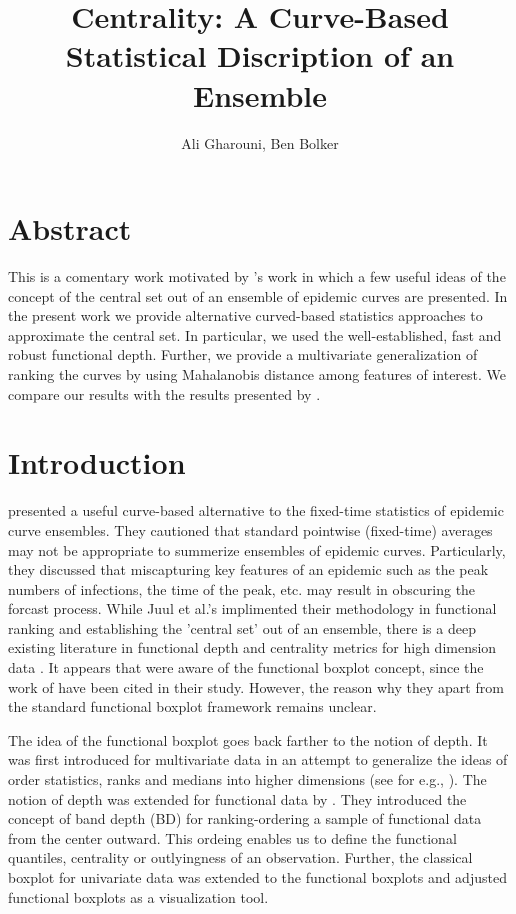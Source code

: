 \documentclass[12pt]{article}
\title{Centrality: A Curve-Based Statistical Discription of an Ensemble}
\author{Ali Gharouni, Ben Bolker}
\theoremstyle{definition} %
\begin{document}
\maketitle
\linenumbers

\section{Abstract}
This is a comentary work motivated by \cite{juul2021fixed}'s work in which a few useful ideas of the concept of the central set out of an ensemble of epidemic curves are presented. In the present work we provide alternative curved-based statistics approaches to approximate the central set. In particular, we used the well-established, fast and robust functional depth. Further, we provide a multivariate generalization of ranking the curves by using Mahalanobis distance among features of interest. We compare our results with the results presented by \cite{juul2021fixed}.      


\section{Introduction}

\cite{juul2021fixed} presented a useful curve-based alternative to the fixed-time statistics of epidemic curve ensembles. 
They cautioned that standard pointwise (fixed-time) averages may not be appropriate to summerize ensembles of epidemic curves. Particularly, they discussed that miscapturing key features of an epidemic such as the peak numbers of infections, the time of the peak, etc. may result in obscuring the forcast process.
While Juul et al.'s implimented their methodology in functional ranking and establishing the 'central set' out of an ensemble, there is a deep existing literature in functional depth and centrality metrics for high dimension data \citep{fraiman2001trimmed, lopez2007depth, lopez2009concept, sun2011functional,sun2012exact}. It appears that \cite{juul2021fixed} were aware of the functional boxplot concept, since the work of \cite{sun2011functional} have been cited in their study. However, the reason why they apart from the standard functional boxplot framework remains unclear.  


The idea of the functional boxplot goes back farther to the notion of depth. It was first introduced for multivariate data in an attempt to generalize the ideas of order statistics, ranks and medians into higher dimensions (see for e.g., \cite{mahalanobis1936generalized,tukey1975mathematics}).
The notion of depth was extended for functional data by \citep{lopez2009concept}. They introduced the concept of band depth (BD) for ranking-ordering  a sample of functional data from the center outward. This ordeing enables us to define the functional quantiles, centrality or outlyingness of an observation. Further, the classical boxplot for univariate data was extended to the functional boxplots and adjusted functional boxplots \citep{sun2011functional,sun2012adjusted} as a visualization tool. 
\end{document}
